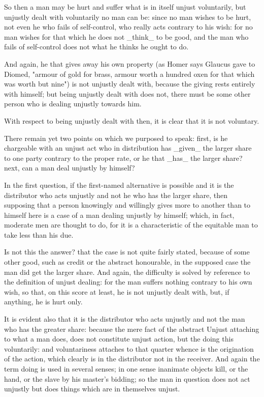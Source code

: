 So then a man may be hurt and suffer what is in itself unjust
voluntarily, but unjustly dealt with voluntarily no man can be: since no
man wishes to be hurt, not even he who fails of self-control, who really
acts contrary to his wish: for no man wishes for that which he does not
_think_ to be good, and the man who fails of self-control does not what
he thinks he ought to do.

And again, he that gives away his own property (as Homer says Glaucus
gave to Diomed, "armour of gold for brass, armour worth a hundred oxen
for that which was worth but nine") is not unjustly dealt with, because
the giving rests entirely with himself; but being unjustly dealt with
does not, there must be some other person who is dealing unjustly
towards him.

With respect to being unjustly dealt with then, it is clear that it is
not voluntary.

There remain yet two points on which we purposed to speak: first, is he
chargeable with an unjust act who in distribution has _given_ the larger
share to one party contrary to the proper rate, or he that _has_ the
larger share? next, can a man deal unjustly by himself?

In the first question, if the first-named alternative is possible and
it is the distributor who acts unjustly and not he who has the larger
share, then supposing that a person knowingly and willingly gives more
to another than to himself here is a case of a man dealing unjustly by
himself; which, in fact, moderate men are thought to do, for it is a
characteristic of the equitable man to take less than his due.

Is not this the answer? that the case is not quite fairly stated,
because of some other good, such as credit or the abstract honourable,
in the supposed case the man did get the larger share. And again, the
difficulty is solved by reference to the definition of unjust dealing:
for the man suffers nothing contrary to his own wish, so that, on this
score at least, he is not unjustly dealt with, but, if anything, he is
hurt only.

It is evident also that it is the distributor who acts unjustly and not
the man who has the greater share: because the mere fact of the abstract
Unjust attaching to what a man does, does not constitute unjust action,
but the doing this voluntarily: and voluntariness attaches to that
quarter whence is the origination of the action, which clearly is in the
distributor not in the receiver. And again the term doing is used in
several senses; in one sense inanimate objects kill, or the hand, or
the slave by his master's bidding; so the man in question does not act
unjustly but does things which are in themselves unjust.

